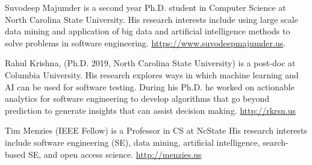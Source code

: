 \documentclass[10pt,journal,compsoc]{IEEEtran}
\begin{document}

 
\newpage
\begin{minipage}{\linewidth}
\begin{IEEEbiography}{Suvodeep Majumder}
 is a second year Ph.D. student in Computer Science at North Carolina State University.  
  His research interests include using large scale data mining and application of big data and artificial intelligence methods to solve problems in software engineering.
  \url{https://www.suvodeepmajumder.us}.
\end{IEEEbiography}
\begin{IEEEbiography}{Rahul Krishna}, (Ph.D. 2019, North
Carolina State University) is a post-doc at Columbia University.
His research explores ways in which machine learning and AI can be used for software testing.
During his Ph.D. he worked on actionable analytics for software engineering to  develop algorithms that go beyond prediction to generate insights that can assist decision making.   \url{http://rkrsn.us}
\end{IEEEbiography}
\begin{IEEEbiography}{Tim Menzies} (IEEE Fellow)
is a Professor in CS at NcState  His research interests include software engineering (SE), data mining, artificial intelligence, search-based SE, and open access science. \url{http://menzies.us}
\end{IEEEbiography}
\end{minipage}

\newpage

\end{document}

